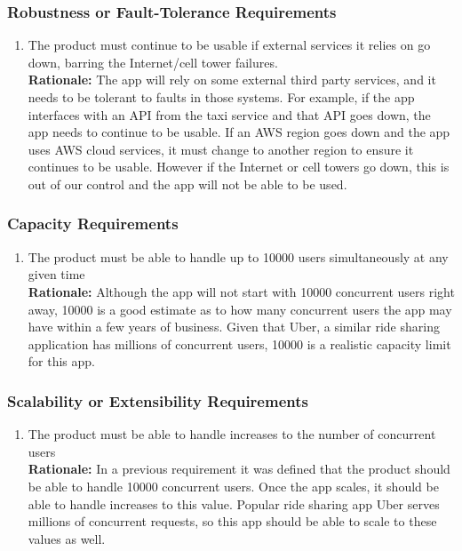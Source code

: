 \documentclass[]{article}
\begin{document}
\subsubsection{Robustness or Fault-Tolerance Requirements}
\label{ssub:robustness_or_fault_tolerance_requirements}
\begin{enumerate}[{PR-RFT}1. ]
	\item The product must continue to be usable if external services it relies on go down, barring the Internet/cell tower failures.\\
	{\bf Rationale:} The app will rely on some external third party services, and it needs to be tolerant to faults in those systems. For example, if the app interfaces with an API from the taxi service and that API goes down, the app needs to continue to be usable. If an AWS region goes down and the app uses AWS cloud services, it must change to another region to ensure it continues to be usable. However if the Internet or cell towers go down, this is out of our control and the app will not be able to be used.
\end{enumerate}

\subsubsection{Capacity Requirements}
\label{ssub:capacity_requirements}
\begin{enumerate}[{PR-C}1. ]
	\item The product must be able to handle up to 10000 users simultaneously at any given time \\
	{\bf Rationale:} Although the app will not start with 10000 concurrent users right away, 10000 is a good estimate as to how many concurrent users the app may have within a few years of business. Given that Uber, a similar ride sharing application has millions of concurrent users, 10000 is a realistic capacity limit for this app.
\end{enumerate}

\subsubsection{Scalability or Extensibility Requirements}
\label{ssub:scalability_or_extensibility_requirements}
\begin{enumerate}[{PR-SE}1. ]
	\item The product must be able to handle increases to the number of concurrent users \\
	{\bf Rationale:} In a previous requirement it was defined that the product should be able to handle 10000 concurrent users. Once the app scales, it should be able to handle increases to this value. Popular ride sharing app Uber serves millions of concurrent requests, so this app should be able to scale to these values as well.
\end{enumerate}
\end{document}
